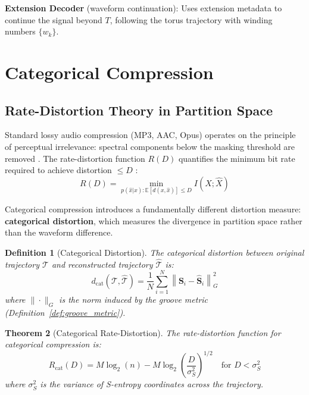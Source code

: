 \documentclass[twocolumn,10pt]{article}
\newtheorem{theorem}{Theorem}[section]
\newtheorem{definition}[theorem]{Definition}
\theoremstyle{remark}
\newcommand{\calT}{\mathcal{T}}
\begin{document}
\textbf{Extension Decoder} (waveform continuation):
Uses extension metadata to continue the signal beyond $T$, following the torus trajectory with winding numbers $\{w_k\}$.


\section{Categorical Compression}
\label{sec:compression}

\subsection{Rate-Distortion Theory in Partition Space}

Standard lossy audio compression (MP3, AAC, Opus) operates on the principle of perceptual irrelevance: spectral components below the masking threshold are removed \cite{zwicker2007, brandenburg1994}. The rate-distortion function $R(D)$ quantifies the minimum bit rate required to achieve distortion $\leq D$ \cite{berger1971, cover2006}:
\begin{equation}
    R(D) = \min_{p(\hat{x}|x): \mathbb{E}[d(x,\hat{x})] \leq D} I(X; \hat{X})
    \label{eq:rate_distortion}
\end{equation}

Categorical compression introduces a fundamentally different distortion measure: \textbf{categorical distortion}, which measures the divergence in partition space rather than the waveform difference.

\begin{definition}[Categorical Distortion]
\label{def:categorical_distortion}
The categorical distortion between original trajectory $\calT$ and reconstructed trajectory $\hat{\calT}$ is:
\begin{equation}
    d_{\mathrm{cat}}(\calT, \hat{\calT}) = \frac{1}{N} \sum_{i=1}^{N} \left\| \mathbf{S}_i - \hat{\mathbf{S}}_i \right\|_G^2
    \label{eq:categorical_distortion}
\end{equation}
where $\|\cdot\|_G$ is the norm induced by the groove metric (Definition~\ref{def:groove_metric}).
\end{definition}

\begin{theorem}[Categorical Rate-Distortion]
\label{thm:cat_rate_distortion}
The rate-distortion function for categorical compression is:
\begin{equation}
    R_{\mathrm{cat}}(D) = M \log_2(n) - M \log_2\!\left(\frac{D}{\sigma_S^2}\right)^{1/2} \quad \text{for } D < \sigma_S^2
    \label{eq:cat_rate_distortion}
\end{equation}
where $\sigma_S^2$ is the variance of S-entropy coordinates across the trajectory.
\end{theorem}
\end{document}

